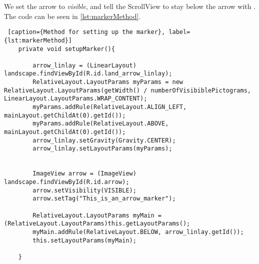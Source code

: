 We set the arrow to \textit{visible}, and tell the ScrollView to stay below the arrow with . The code can be seen in \ref{lst:markerMethod}.

\begin{lstlisting} [caption={Method for setting up the marker}, label={lst:markerMethod}]
    private void setupMarker(){

        arrow_linlay = (LinearLayout) landscape.findViewById(R.id.land_arrow_linlay);
        RelativeLayout.LayoutParams myParams = new RelativeLayout.LayoutParams(getWidth() / numberOfVisibiblePictograms, LinearLayout.LayoutParams.WRAP_CONTENT);
        myParams.addRule(RelativeLayout.ALIGN_LEFT, mainLayout.getChildAt(0).getId());
        myParams.addRule(RelativeLayout.ABOVE, mainLayout.getChildAt(0).getId());
        arrow_linlay.setGravity(Gravity.CENTER);
        arrow_linlay.setLayoutParams(myParams);


        ImageView arrow = (ImageView) landscape.findViewById(R.id.arrow);
        arrow.setVisibility(VISIBLE);
        arrow.setTag("This_is_an_arrow_marker");

        RelativeLayout.LayoutParams myMain = (RelativeLayout.LayoutParams)this.getLayoutParams();
        myMain.addRule(RelativeLayout.BELOW, arrow_linlay.getId());
        this.setLayoutParams(myMain);

    }
\end{lstlisting}